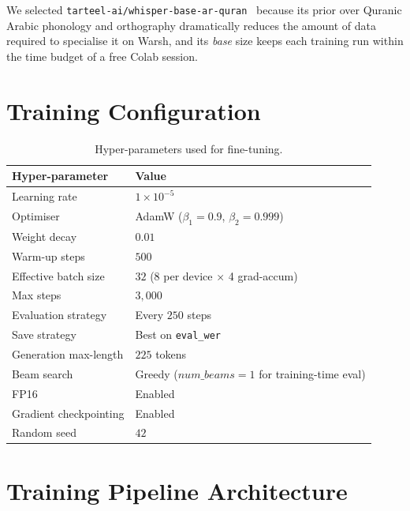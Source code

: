 We selected \texttt{tarteel-ai/whisper-base-ar-quran}~\cite{tarteelmodel}
because its prior over Quranic Arabic phonology and orthography
dramatically reduces the amount of data required to specialise it on
Warsh, and its \emph{base} size keeps each training run within the time
budget of a free Colab session.

\section{Training Configuration}

\begin{table}[H]
  \centering
  \caption{Hyper-parameters used for fine-tuning.}
  \label{tab:mt_hyperparams}
  \renewcommand{\arraystretch}{1.3}
  \begin{tabular}{ll}
    \toprule
    \textbf{Hyper-parameter} & \textbf{Value} \\
    \midrule
    Learning rate                & $1\times 10^{-5}$ \\
    Optimiser                    & AdamW ($\beta_1=0.9$, $\beta_2=0.999$) \\
    Weight decay                 & $0.01$ \\
    Warm-up steps                & $500$ \\
    Effective batch size         & $32$ (8 per device $\times$ 4 grad-accum) \\
    Max steps                    & $3{,}000$ \\
    Evaluation strategy          & Every $250$ steps \\
    Save strategy                & Best on \texttt{eval\_wer} \\
    Generation max-length        & $225$ tokens \\
    Beam search                  & Greedy ($num\_beams=1$ for training-time eval) \\
    FP16                         & Enabled \\
    Gradient checkpointing       & Enabled \\
    Random seed                  & $42$ \\
    \bottomrule
  \end{tabular}
\end{table}

\section{Training Pipeline Architecture}

